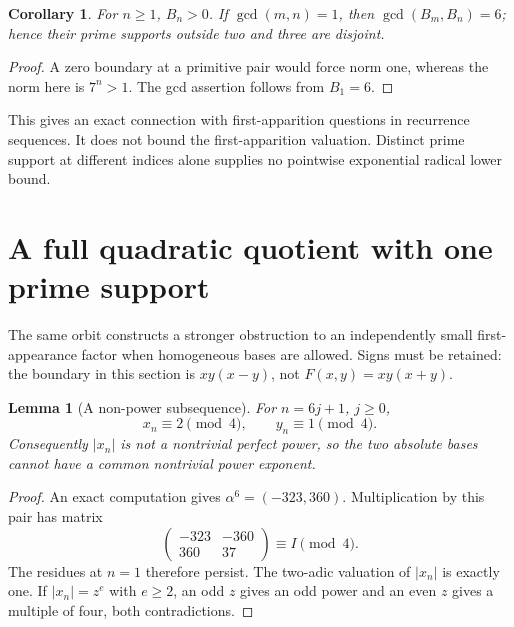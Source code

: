 \documentclass[11pt]{article}
\newtheorem{lemma}[theorem]{Lemma}
\newtheorem{corollary}[theorem]{Corollary}
\theoremstyle{definition}
\theoremstyle{remark}
\begin{document}
\begin{corollary}
For $n\ge1$, $B_n>0$. If $\gcd(m,n)=1$, then $\gcd(B_m,B_n)=6$; hence their prime supports outside two and three are disjoint.
\end{corollary}
\begin{proof}
A zero boundary at a primitive pair would force norm one, whereas the norm here is $7^n>1$. The gcd assertion follows from $B_1=6$.
\end{proof}
This gives an exact connection with first-apparition questions in recurrence sequences. It does not bound the first-apparition valuation. Distinct prime support at different indices alone supplies no pointwise exponential radical lower bound.

\section{A full quadratic quotient with one prime support}
The same orbit constructs a stronger obstruction to an independently small first-appearance factor when homogeneous bases are allowed. Signs must be retained: the boundary in this section is $xy(x-y)$, not $F(x,y)=xy(x+y)$.

\begin{lemma}[A non-power subsequence]\label{lem:modfour}
For $n=6j+1$, $j\ge0$,
\[
x_n\equiv2\pmod4,\qquad y_n\equiv1\pmod4.
\]
Consequently $|x_n|$ is not a nontrivial perfect power, so the two absolute bases cannot have a common nontrivial power exponent.
\end{lemma}
\begin{proof}
An exact computation gives $\alpha^6=(-323,360)$. Multiplication by this pair has matrix
\[
\begin{pmatrix}-323&-360\\360&37\end{pmatrix}\equiv I\pmod4.
\]
The residues at $n=1$ therefore persist. The two-adic valuation of $|x_n|$ is exactly one. If $|x_n|=z^e$ with $e\ge2$, an odd $z$ gives an odd power and an even $z$ gives a multiple of four, both contradictions.
\end{proof}
\end{document}

